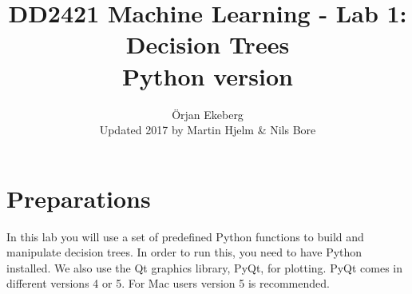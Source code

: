 \documentclass[11pt]{article}
\title{\vspace{-5.0cm}DD2421 Machine Learning - Lab 1: Decision Trees \\ Python version}
\author{\"Orjan Ekeberg\\ Updated 2017 by Martin Hjelm \& Nils Bore }
\begin{document}
\maketitle

\section{Preparations}

In this lab you will use a set of predefined Python functions to
build and manipulate decision trees.  In order to run this, you
need to have Python installed.  We also use the Qt graphics library,
PyQt, for plotting. PyQt comes in different versions 4 or 5. For
Mac users version 5 is recommended.
\end{document}
